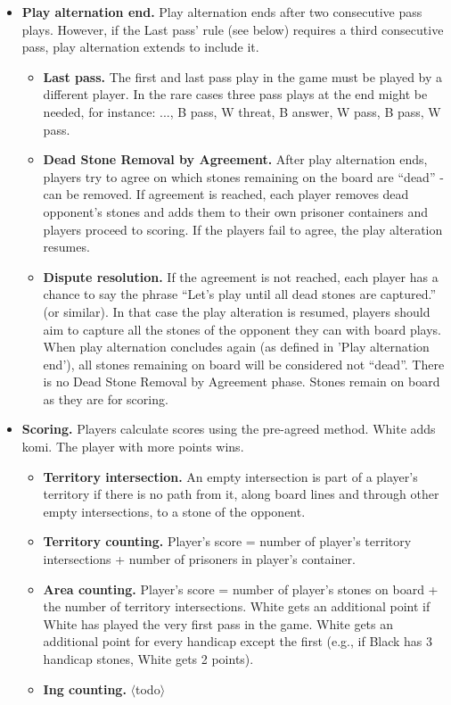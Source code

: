 \documentclass[11pt]{article}
\begin{document}
\begin{itemize}
\item \textbf{Play alternation end.} Play alternation ends after two consecutive pass plays.
However, if the Last pass' rule (see below) requires a third consecutive pass, play alternation extends to include it.
    \begin{itemize}
    \item \textbf{Last pass.} The first and last pass play in the game must be played by a different player.
    In the rare cases three pass plays at the end might be needed, for instance: ..., B pass, W threat, B answer, W pass, B pass, W pass.
    \item \textbf{Dead Stone Removal by Agreement.} After play alternation ends, players try to agree on which stones remaining on the board are ``dead'' - can be removed.
    If agreement is reached, each player removes dead opponent's stones and adds them to their own prisoner containers and players proceed to scoring.
    If the players fail to agree, the play alteration resumes.
    \item \textbf{Dispute resolution.} If the agreement is not reached, each player has a chance to say the phrase ``Let's play until all dead stones are captured.'' (or similar).
    In that case the play alteration is resumed, players should aim to capture all the stones of the opponent they can with board plays.
    When play alternation concludes again (as defined in 'Play alternation end'), all stones remaining on board will be considered not ``dead''.
    There is no Dead Stone Removal by Agreement phase.
    Stones remain on board as they are for scoring.
    \end{itemize}

\item \textbf{Scoring.} Players calculate scores using the pre-agreed method.
White adds komi.
The player with more points wins.
    \begin{itemize}
    \item \textbf{Territory intersection.} An empty intersection is part of a player's territory if there is no path from it, along board lines and through other empty intersections, to a stone of the opponent.
    \item \textbf{Territory counting.} Player's score = number of player's territory intersections + number of prisoners in player's container.
    \item \textbf{Area counting.} Player's score = number of player's stones on board + the number of territory intersections.
    White gets an additional point if White has played the very first pass in the game.
    White gets an additional point for every handicap except the first (e.g., if Black has 3 handicap stones, White gets 2 points).
    \item \textbf{Ing counting.} $\langle$todo$\rangle$
    \end{itemize}
\end{itemize}
\end{document}
